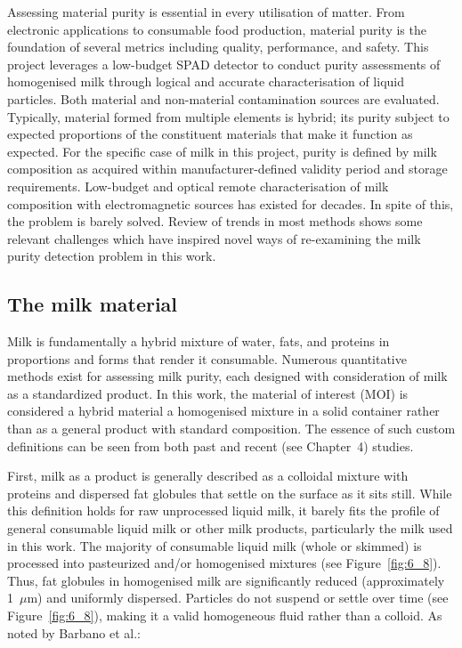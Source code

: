 \documentclass[12pt,a4paper,oneside]{report}
\begin{document}
Assessing material purity is essential in every utilisation of matter. From electronic applications \cite{barbano1989} to consumable food production, material purity is the foundation of several metrics including quality, performance, and safety. This project leverages a low-budget SPAD detector to conduct purity assessments of homogenised milk through logical and accurate characterisation of liquid particles. Both material and non-material contamination sources are evaluated. Typically, material formed from multiple elements is hybrid; its purity subject to expected proportions of the constituent materials that make it function as expected. For the specific case of milk in this project, purity is defined by milk composition as acquired within manufacturer-defined validity period and storage requirements. Low-budget and optical remote characterisation of milk composition with electromagnetic sources has existed for decades. In spite of this, the problem is barely solved. Review of trends \cite{joolaei2025} in most methods shows some relevant challenges which have inspired novel ways of re-examining the milk purity detection problem in this work.

\subsection{The milk material}
\label{subsec:the_milk_material}

Milk is fundamentally a hybrid mixture of water, fats, and proteins in proportions and forms that render it consumable. Numerous quantitative methods exist for assessing milk purity, each designed with consideration of milk as a standardized product. In this work, the material of interest (MOI) is considered a hybrid material a homogenised mixture in a solid container rather than as a general product with standard composition. The essence of such custom definitions can be seen from both past \cite{chandra2024} and recent (see Chapter~4) studies.

First, milk as a product is generally described as a colloidal mixture with proteins and dispersed fat globules that settle on the surface as it sits still. While this definition holds for raw unprocessed liquid milk, it barely fits the profile of general consumable liquid milk or other milk products, particularly the milk used in this work. The majority of consumable liquid milk (whole or skimmed) is processed \cite{walstra1999} into pasteurized and/or homogenised mixtures (see Figure~\ref{fig:6_8}). Thus, fat globules in homogenised milk are significantly reduced (approximately 1~$\mu$m) and uniformly dispersed. Particles do not suspend or settle over time (see Figure~\ref{fig:6_8}), making it a valid homogeneous fluid rather than a colloid. As noted by Barbano et al.:
\end{document}
